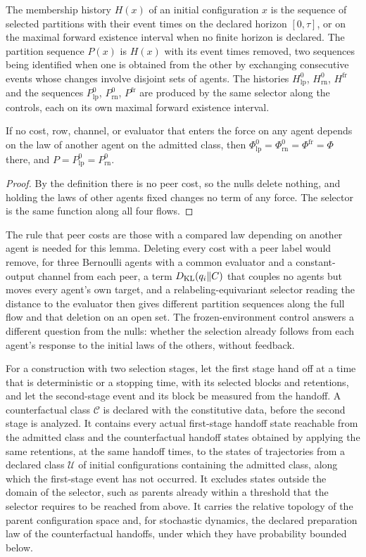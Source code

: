 The membership history $H(x)$ of an initial configuration $x$ is the
sequence of selected partitions with their event times on the declared
horizon $[0,\tau]$, or on the maximal forward existence interval when no
finite horizon is declared. The partition sequence $P(x)$ is $H(x)$ with its
event times removed, two sequences being identified when one is obtained
from the other by exchanging consecutive events whose changes involve
disjoint sets of agents. The histories $H^0_{\mathrm{lp}}$,
$H^0_{\mathrm{rn}}$, $H^{\mathrm{fr}}$ and the sequences $P^0_{\mathrm{lp}}$,
$P^0_{\mathrm{rn}}$, $P^{\mathrm{fr}}$ are produced by the same selector
along the controls, each on its own maximal forward existence interval.

If no cost, row, channel, or evaluator that enters the force on any agent
depends on the law of another agent on the admitted class, then
$\Phi^0_{\mathrm{lp}}=\Phi^0_{\mathrm{rn}}=\Phi^{\mathrm{fr}}=\Phi$ there, and
$P=P^0_{\mathrm{lp}}=P^0_{\mathrm{rn}}$.
\begin{proof}
By the definition there is no peer cost, so the nulls delete nothing, and
holding the laws of other agents fixed changes no term of any force. The
selector is the same function along all four flows.
\end{proof}

The rule that peer costs are those with a compared law depending on another
agent is needed for this lemma. Deleting every cost with a peer label would
remove, for three Bernoulli agents with a common evaluator and a
constant-output channel from each peer, a term $D_{\mathrm{KL}}(q_i\Vert C)$ that couples
no agents but moves every agent's own target, and a relabeling-equivariant
selector reading the distance to the evaluator then gives different
partition sequences along the full flow and that deletion on an open set.
The frozen-environment control answers a different question from the nulls:
whether the selection already follows from each agent's response to the
initial laws of the others, without feedback.

For a construction with two selection stages, let the first stage hand off
at a time that is deterministic or a stopping time, with its selected blocks
and retentions, and let the second-stage event and its block be measured from
the handoff. A counterfactual class $\mathcal C$ is declared with the
constitutive data, before the second stage is analyzed. It contains every
actual first-stage handoff state reachable from the admitted class and the
counterfactual handoff states obtained by applying the same retentions, at
the same handoff times, to the states of trajectories from a declared class
$\mathcal U$ of initial configurations containing the admitted class, along
which the first-stage event has not occurred. It excludes states outside the
domain of the selector, such as parents already within a threshold that the
selector requires to be reached from above. It carries the relative
topology of the parent configuration space and, for stochastic dynamics, the
declared preparation law of the counterfactual handoffs, under which they
have probability bounded below.

